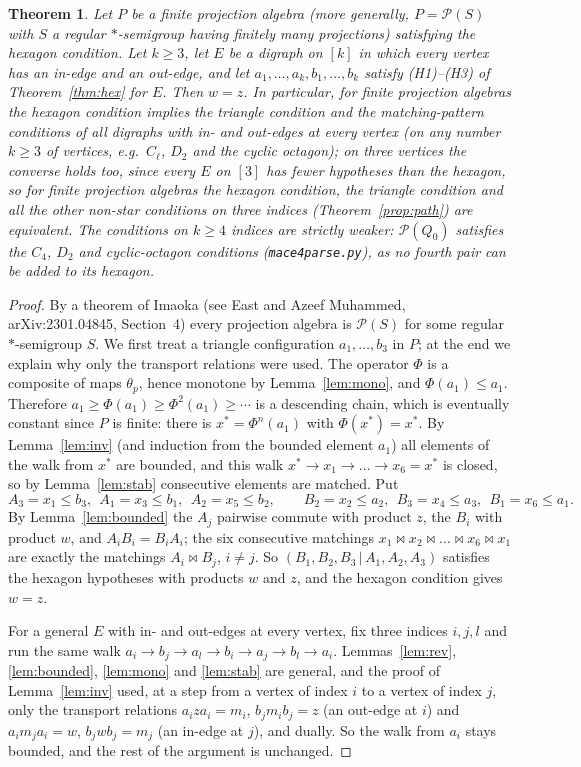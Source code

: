 \documentclass[11pt]{amsart}
\newtheorem{theorem}{Theorem}[section]
\theoremstyle{definition}
\renewcommand{\P}{\mathcal{P}}
\begin{document}
\begin{theorem}\label{thm:equiv}
Let $P$ be a finite projection algebra (more generally, $P=\P(S)$ with $S$ a regular $*$-semigroup having finitely many projections) satisfying the hexagon condition. Let $k\ge3$, let $E$ be a digraph on $[k]$ in which every vertex has an in-edge and an out-edge, and let $a_1,\dots,a_k,b_1,\dots,b_k$ satisfy (H1)--(H3) of Theorem~\ref{thm:hex} for $E$. Then $w=z$. In particular, for finite projection algebras the hexagon condition implies the triangle condition and the matching-pattern conditions of all digraphs with in- and out-edges at every vertex (on any number $k\ge3$ of vertices, e.g.\ $C_\ell$, $D_2$ and the cyclic octagon); on three vertices the converse holds too, since every $E$ on $[3]$ has fewer hypotheses than the hexagon, so for finite projection algebras the hexagon condition, the triangle condition and all the other non-star conditions on three indices (Theorem~\ref{prop:path}) are equivalent. The conditions on $k\ge4$ indices are strictly weaker: $\P(Q_0)$ satisfies the $C_4$, $D_2$ and cyclic-octagon conditions (\texttt{mace4parse.py}), as no fourth pair can be added to its hexagon.
\end{theorem}
\begin{proof}
By a theorem of Imaoka (see East and Azeef Muhammed, arXiv:2301.04845, Section~4) every projection algebra is $\P(S)$ for some regular $*$-semigroup $S$. We first treat a triangle configuration $a_1,\dots,b_3$ in $P$; at the end we explain why only the transport relations were used. The operator $\Phi$ is a composite of maps $\theta_p$, hence monotone by Lemma~\ref{lem:mono}, and $\Phi(a_1)\le a_1$. Therefore $a_1\ge\Phi(a_1)\ge\Phi^2(a_1)\ge\cdots$ is a descending chain, which is eventually constant since $P$ is finite: there is $x^*=\Phi^n(a_1)$ with $\Phi(x^*)=x^*$. By Lemma~\ref{lem:inv} (and induction from the bounded element $a_1$) all elements of the walk from $x^*$ are bounded, and this walk $x^*\to x_1\to\dots\to x_6=x^*$ is closed, so by Lemma~\ref{lem:stab} consecutive elements are matched. Put
\[
A_3=x_1\le b_3,\ \ A_1=x_3\le b_1,\ \ A_2=x_5\le b_2,\qquad B_2=x_2\le a_2,\ \ B_3=x_4\le a_3,\ \ B_1=x_6\le a_1 .
\]
By Lemma~\ref{lem:bounded} the $A_j$ pairwise commute with product $z$, the $B_i$ with product $w$, and $A_iB_i=B_iA_i$; the six consecutive matchings $x_1\bowtie x_2\bowtie\dots\bowtie x_6\bowtie x_1$ are exactly the matchings $A_i\bowtie B_j$, $i\ne j$. So $(B_1,B_2,B_3\,|\,A_1,A_2,A_3)$ satisfies the hexagon hypotheses with products $w$ and $z$, and the hexagon condition gives $w=z$.

For a general $E$ with in- and out-edges at every vertex, fix three indices $i,j,l$ and run the same walk $a_i\to b_j\to a_l\to b_i\to a_j\to b_l\to a_i$. Lemmas~\ref{lem:rev}, \ref{lem:bounded}, \ref{lem:mono} and \ref{lem:stab} are general, and the proof of Lemma~\ref{lem:inv} used, at a step from a vertex of index $i$ to a vertex of index $j$, only the transport relations $a_iza_i=m_i$, $b_jm_ib_j=z$ (an out-edge at $i$) and $a_im_ja_i=w$, $b_jwb_j=m_j$ (an in-edge at $j$), and dually. So the walk from $a_i$ stays bounded, and the rest of the argument is unchanged.
\end{proof}
\end{document}
